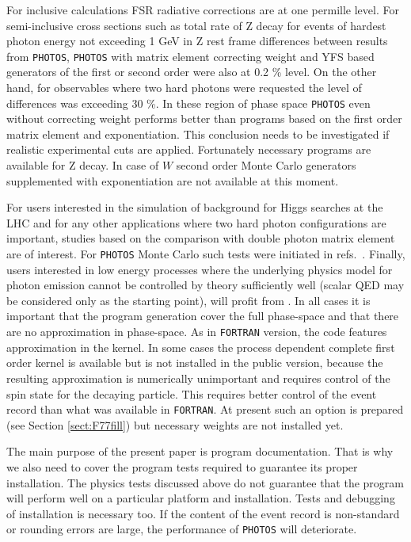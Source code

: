 \documentclass[]{Photos_interface_design}
\begin{document}
For inclusive calculations FSR radiative corrections are at one permille level.
For semi-inclusive cross sections such as total rate of Z decay for events
of hardest photon energy not exceeding 1 GeV in Z rest frame differences
between results from {\tt PHOTOS}, {\tt PHOTOS} with matrix element correcting weight
and YFS based generators of the first or second order were also 
at 0.2 \% level. 
On the other hand, for observables where two hard photons were requested
 the level of differences was exceeding 
 30 \%. In these region of phase space {\tt PHOTOS} even without correcting
weight performs better
than programs based on the first order matrix element and exponentiation.
This conclusion needs to be investigated if   
realistic experimental 
cuts are applied. Fortunately necessary programs are available for Z decay.
In case of $W$ second order Monte Carlo generators supplemented with 
exponentiation are not available at this moment.
 
For users interested in the simulation of
background for Higgs searches at the LHC and for any other applications where 
two hard photon configurations are important, studies based on the comparison with 
double photon matrix element are of 
interest. For {\tt PHOTOS} Monte Carlo such tests were initiated 
in refs.~\cite{Barberio:1993qi,RichterWas:1994ep,RichterWas:1993ta}.
Finally, users interested in low energy processes where the underlying physics model 
for photon emission cannot be controlled by theory sufficiently well
(scalar QED may 
be considered only as the starting point), will profit 
from \cite{Nanava:2009vg,Nanava:2006vv}. In all cases it is important that
the  program generation cover the full phase-space and that there are no 
approximation in phase-space. As in {\tt FORTRAN} version, the code 
features approximation in the kernel. In some cases the process dependent 
complete first order 
kernel is available but is not installed in the public version,  
because the resulting approximation is 
numerically unimportant and requires control of the spin state for the decaying 
particle. This requires better control of the event record than what was available 
in {\tt FORTRAN}. At present such an option is prepared (see Section \ref{sect:F77fill}) but necessary weights are not installed yet. 

The main purpose of the present paper is program documentation. That is why
we also need to cover the program tests required to guarantee its proper installation.
The physics tests discussed above 
do not guarantee that the program will perform well on a particular platform and installation. Tests and debugging of installation
is necessary too.  If the content of the event record is non-standard or rounding errors are large, the performance of {\tt PHOTOS} will deteriorate.
\end{document}
